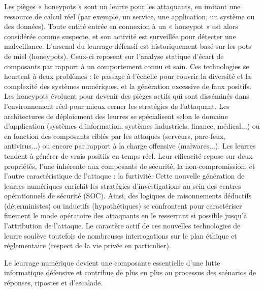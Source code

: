 Les pièges « honeypots » sont un leurre pour les attaquants, en imitant une ressource de calcul réel (par exemple, un service, une application, un système ou des données). Toute entité entrée en connexion à un « honeypot » est alors considérée comme suspecte, et son activité est surveillée pour détecter une malveillance.
L'arsenal du leurrage défensif est historiquement basé sur les pots de miel (honeypots). Ceux-ci reposent sur l'analyse statique d'écart de composants par rapport à un comportement connu et sain. Ces technologies se heurtent à deux problèmes : le passage à l'échelle pour couvrir la diversité et la complexité des systèmes numériques, et la génération excessive de faux positifs. Les honeypots évoluent pour devenir des pièges actifs qui sont disséminés dans l'environnement réel pour mieux cerner les stratégies de l'attaquant. Les architectures de déploiement des leurres se spécialisent selon le domaine d'application (systèmes d'information, systèmes industriels, finance, médical...) ou en fonction des composants ciblés par les attaques (serveurs, pare-feux, antivirus...) ou encore par rapport à la charge offensive (malwares...). Les leurres tendent à générer de vrais positifs en temps réel. Leur efficacité repose sur deux propriétés, l'une inhérente aux composants de sécurité, la non-compromission, et l'autre caractéristique de l'attaque : la furtivité.  
Cette nouvelle génération de leurres numériques enrichit les stratégies d'investigations au sein des centres opérationnels de sécurité (SOC).  Ainsi, des logiques de raisonnements déductifs (déterministes) ou inductifs (hypothétiques) se confrontent pour caractériser finement le mode opératoire des attaquants en le resserrant si possible jusqu'à l'attribution de l'attaque. 
Le caractère actif de ces nouvelles technologies de leurre soulève toutefois de nombreuses  interrogations sur le plan éthique et  réglementaire (respect de la vie privée en particulier).

Le leurrage numérique devient une composante essentielle d'une lutte informatique défensive et contribue de plus en plus au processus des scénarios de réponses, ripostes et d'escalade.

